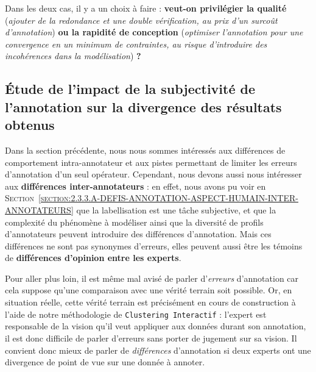 			\begin{leftBarAuthorOpinion}
				Dans les deux cas, il y a un choix à faire : \textbf{veut-on privilégier la qualité} (\textit{ajouter de la redondance et une double vérification, au prix d'un surcoût d'annotation}) \textbf{ou la rapidité de conception} (\textit{optimiser l'annotation pour une convergence en un minimum de contraintes, au risque d'introduire des incohérences dans la modélisation}) \textbf{?}
			\end{leftBarAuthorOpinion}
		
	\subsection{Étude de l'impact de la subjectivité de l'annotation sur la divergence des résultats obtenus}
	\label{section:4.6.3-ETUDE-ROBUSTESSE-SUBJECTIVITE-ANNOTATION-ET-DIVERGENCE}
		
		Dans la section précédente, nous nous sommes intéressés aux différences de comportement intra-annotateur et aux pistes permettant de limiter les erreurs d'annotation d'un seul opérateur.
		Cependant, nous devons aussi nous intéresser aux \textbf{différences inter-annotateurs} :
		en effet, nous avons pu voir en \textsc{Section~\ref{section:2.3.3.A-DEFIS-ANNOTATION-ASPECT-HUMAIN-INTER-ANNOTATEURS}} que la labellisation est une tâche subjective, et que la complexité du phénomène à modéliser ainsi que la diversité de profils d'annotateurs peuvent introduire des différences d'annotation.
		Mais ces différences ne sont pas synonymes d'erreurs, elles peuvent aussi être les témoins de \textbf{différences d'opinion entre les experts}.
		\begin{leftBarAuthorOpinion}
			Pour aller plus loin, il est même mal avisé de parler d'\textit{erreurs} d'annotation car cela suppose qu'une comparaison avec une vérité terrain soit possible.
			Or, en situation réelle, cette vérité terrain est précisément en cours de construction à l'aide de notre méthodologie de \texttt{Clustering Interactif} : l'expert est responsable de la vision qu'il veut appliquer aux données durant son annotation, il est donc difficile de parler d'erreurs sans porter de jugement sur sa vision.
			Il convient donc mieux de parler de \textit{différences} d'annotation si deux experts ont une divergence de point de vue sur une donnée à annoter.
		\end{leftBarAuthorOpinion}
		
